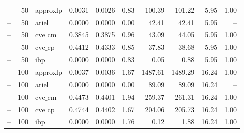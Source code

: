 \begin{table}[ht]
\begin{tabular}{lrlrrrrrrr}
-- & 50 & approxlp & 0.0031 & 0.0026 & 0.83 & 100.39 & 101.22 & 5.95 & 1.00 \\
-- & 50 & ariel & 0.0000 & 0.0000 & 0.00 & 42.41 & 42.41 & 5.95 & -- \\
-- & 50 & $\text{cve\_cm}$ & 0.3845 & 0.3875 & 0.96 & 43.09 & 44.05 & 5.95 & 1.00 \\
-- & 50 & $\text{cve\_cp}$ & 0.4412 & 0.4333 & 0.85 & 37.83 & 38.68 & 5.95 & 1.00 \\
-- & 50 & ibp & 0.0000 & 0.0000 & 0.83 & 0.05 & 0.88 & 5.95 & 1.00 \\
-- & 100 & approxlp & 0.0037 & 0.0036 & 1.67 & 1487.61 & 1489.29 & 16.24 & 1.00 \\
-- & 100 & ariel & 0.0000 & 0.0000 & 0.00 & 89.09 & 89.09 & 16.24 & -- \\
-- & 100 & $\text{cve\_cm}$ & 0.4473 & 0.4401 & 1.94 & 259.37 & 261.31 & 16.24 & 1.00 \\
-- & 100 & $\text{cve\_cp}$ & 0.4744 & 0.4402 & 1.67 & 204.06 & 205.73 & 16.24 & 1.00 \\
-- & 100 & ibp & 0.0000 & 0.0000 & 1.76 & 0.12 & 1.88 & 16.24 & 1.00 \\
\bottomrule
\end{tabular}
\end{table}
